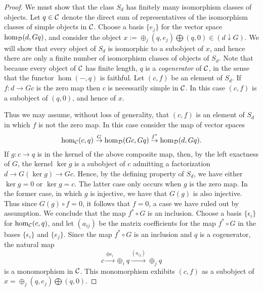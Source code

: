 \documentclass{amsart}
\begin{document}
\begin{proof}
We must show that the class $S_d$ has finitely many isomorphism classes of objects. Let $q \in \mathcal C$ denote the direct sum of representatives of the isomorphism classes of simple objects in $\mathcal C$. Choose a basis $\{e_j\}$ for the vector space $\hom_{\mathcal D}(d, G q)$, and consider the object $x := \oplus_j( q, e_j) \bigoplus (q,0) \in (d \downarrow G)$. We will show that every object of $S_d$ is isomorphic to a subobject of $x$, and hence there are only a finite number of isomorphism classes of objects of $S_d$. Note that because every object of $\mathcal C$ has finite length, $q$ is a {\em cogenerator} of $\mathcal C$, in the sense that the functor $\hom(-, q)$ is faithful. Let $(c, f)$ be an element of $S_d$. If $f: d \to G c$ is the zero map then $c$ is necessarily simple in $\mathcal C$. In this case $(c, f)$ is a subobject of $(q, 0)$, and hence of $x$. 

Thus we may assume, without loss of generality, that  $(c, f)$ is an element of $S_d$ in which $f$ is not the zero map. In this case consider the map of vector spaces
\begin{equation*}
	\hom_{\mathcal C}(c,q) \stackrel{G}{\to} \hom_{\mathcal D}(G c, G q) \stackrel{f^*}{\to} \hom_{\mathcal D}(d, G q).
\end{equation*} 
If $g: c \to q$ is in the kernel of the above composite map, then, by the left exactness of $G$, the kernel $\ker g$ is a subobject of $c$ admitting a factorization $d \to G(\ker g) \to G c$. Hence, by the defining property of $S_d$, we have either $\ker g = 0$ or $\ker g = c$. The latter case only occurs when $g$ is the zero map. In the former case, in which $g$ is injective, we have that $G(g)$ is also injective. Thus since $G(g) \circ f = 0$, it follows that $f = 0$, a case we have ruled out by assumption. We conclude that the map $f^* \circ G$ is an inclusion. Choose a basis  $\{ \epsilon_i \}$ for $\hom_{\mathcal C}(c,q)$, and let $(a_{ij})$ be the matrix coefficients for the map $f^* \circ G$ in the bases $\{ \epsilon_i \}$ and $\{ e_j \}$. Since the map $f^* \circ G$ is an inclusion and $q$ is a cogenerator, the natural map
\begin{equation*}
	c \stackrel{\oplus \epsilon_i}{\to} \oplus_i q \stackrel{(a_{ij}) }{\to} \oplus_j q
\end{equation*} 
is a monomorphism in $\mathcal C$. This monomorphism exhibits $(c,f)$ as a subobject of $x = \oplus_j( q, e_j) \bigoplus (q,0)$. 
\end{proof}
\end{document}
